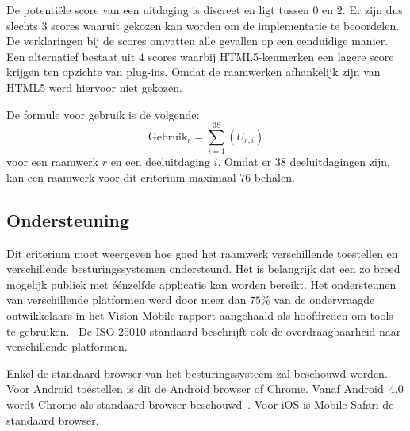 De potentiële score van een uitdaging is discreet en ligt tussen $0$ en $2$.
Er zijn dus slechts $3$ scores waaruit gekozen kan worden om de implementatie te beoordelen.
De verklaringen bij de scores omvatten alle gevallen op een eenduidige manier.
Een alternatief bestaat uit $4$ scores waarbij HTML5-kenmerken een lagere score krijgen ten opzichte van plug-ins.
Omdat de raamwerken afhankelijk zijn van HTML5 werd hiervoor niet gekozen.

De formule voor gebruik is de volgende:
\begin{equation}
  \text{Gebruik}_r = \sum_{i=1}^{38}{\left(U_{r,i}\right)}
  \label{eq:gebruik}
\end{equation}
voor een raamwerk $r$ en een deeluitdaging $i$.
Omdat er $38$ deeluitdagingen zijn, kan een raamwerk voor dit criterium maximaal $76$ behalen.


\subsection{Ondersteuning}
\label{sec:vergelijking-ondersteuning}
Dit criterium moet weergeven hoe goed het raamwerk verschillende toestellen en verschillende besturingssystemen ondersteund.
Het is belangrijk dat een zo breed mogelijk publiek met éénzelfde applicatie kan worden bereikt.
Het ondersteunen van verschillende platformen werd door meer dan $75\%$ van de ondervraagde ontwikkelaars in het Vision Mobile rapport aangehaald als hoofdreden om  tools te gebruiken.~\cite{Mobile2012} 
De ISO 25010-standaard beschrijft ook de overdraagbaarheid naar verschillende platformen.


Enkel de standaard browser van het besturingssysteem zal beschouwd worden.
Voor Android toestellen is dit de Android browser of Chrome.  
Vanaf Android~4.0 wordt Chrome als standaard browser beschouwd~\cite{Wimberly2008}.
Voor iOS is Mobile Safari de standaard browser.

